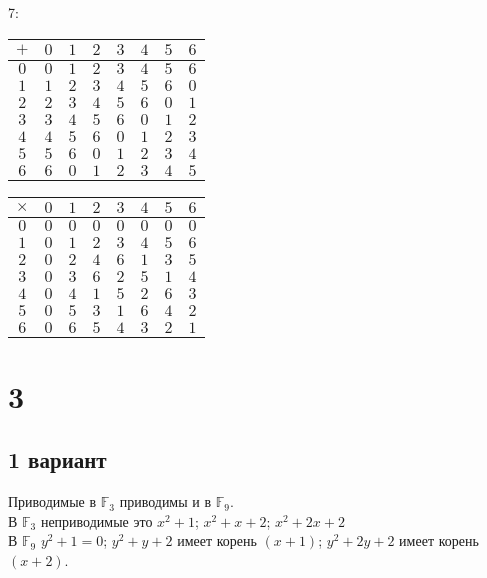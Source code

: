 		7:
		\begin{center}
			\begin{tabular}{|c|c|c|c|c|c|c|c|}
				\hline
				$+ $&$ 0 $&$ 1 $&$ 2 $&$ 3 $&$ 4 $&$ 5 $&$ 6$\\
				\hline
				$0 $&$ 0 $&$ 1 $&$ 2 $&$ 3 $&$ 4 $&$ 5 $&$ 6$\\
				\hline
				$1 $&$ 1 $&$ 2 $&$ 3 $&$ 4 $&$ 5 $&$ 6 $&$ 0$\\
				\hline
				$2 $&$ 2 $&$ 3 $&$ 4 $&$ 5 $&$ 6 $&$ 0 $&$ 1$\\
				\hline
				$3 $&$ 3 $&$ 4 $&$ 5 $&$ 6 $&$ 0 $&$ 1 $&$ 2$\\
				\hline
				$4 $&$ 4 $&$ 5 $&$ 6 $&$ 0 $&$ 1 $&$ 2 $&$ 3$\\
				\hline
				$5 $&$ 5 $&$ 6 $&$ 0 $&$ 1 $&$ 2 $&$ 3 $&$ 4$\\
				\hline
				$6 $&$ 6 $&$ 0 $&$ 1 $&$ 2 $&$ 3 $&$ 4 $&$ 5$\\
				\hline
			\end{tabular}
		\end{center}
		\begin{center}
			\begin{tabular}{|c|c|c|c|c|c|c|c|}
				\hline
				$\times $&$ 0 $&$ 1 $&$ 2 $&$ 3 $&$ 4 $&$ 5 $&$ 6$\\
				\hline
				$0 $&$ 0 $&$ 0 $&$ 0 $&$ 0 $&$ 0 $&$ 0 $&$ 0$\\
				\hline
				$1 $&$ 0 $&$ 1 $&$ 2 $&$ 3 $&$ 4 $&$ 5 $&$ 6$\\
				\hline
				$2 $&$ 0 $&$ 2 $&$ 4 $&$ 6 $&$ 1 $&$ 3 $&$ 5$\\
				\hline
				$3 $&$ 0 $&$ 3 $&$ 6 $&$ 2 $&$ 5 $&$ 1 $&$ 4$\\
				\hline
				$4 $&$ 0 $&$ 4 $&$ 1 $&$ 5 $&$ 2 $&$ 6 $&$ 3$\\
				\hline
				$5 $&$ 0 $&$ 5 $&$ 3 $&$ 1 $&$ 6 $&$ 4 $&$ 2$\\
				\hline
				$6 $&$ 0 $&$ 6 $&$ 5 $&$ 4 $&$ 3 $&$ 2 $&$ 1$\\
				\hline
			\end{tabular}
		\end{center}

\newpage
\section{3}
	\subsection{1 вариант}
		Приводимые в $\mathbb{F}_3$ приводимы и в $\mathbb{F}_9$.\\
		В $\mathbb{F}_3$ неприводимые это $x^2 + 1$; $x^2 + x + 2$; $x^2 + 2x + 2$\\
		В $\mathbb{F}_9$ $y^2 + 1 = 0$; $y^2 + y + 2$ имеет корень $(x + 1)$; $y^2 + 2y + 2$ имеет корень $(x + 2)$.
		

